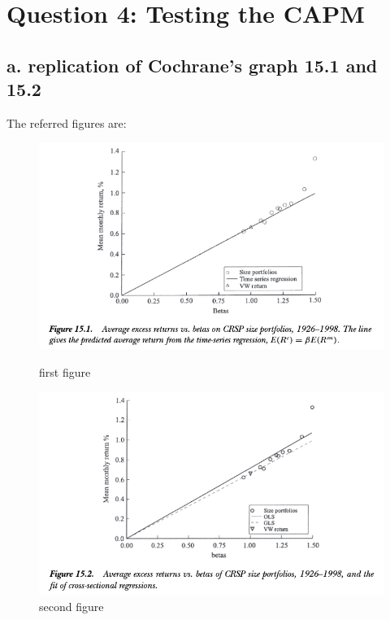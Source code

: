 \documentclass[]{article}
\title{}
\author{}
\begin{document}
	
	\maketitle
	
	
	\section*{Question 4: Testing the CAPM}
	\subsection*{a. replication of Cochrane's graph 15.1 and 15.2}
	
	The referred figures are:
	
\begin{figure}[H]
	\centering
	\begin{minipage}{0.45\textwidth}
		\centering
		\includegraphics[width=1.5\textwidth]{Cochrane_15_1.png} %
		\caption{first figure}
	\end{minipage}\hfill
	\begin{minipage}{0.45\textwidth}
		\centering
		\includegraphics[width=1.5\textwidth]{Cochrane_15_2.png} %
		\caption{second figure}
	\end{minipage}
\end{figure}
	
	
	
\end{document}
